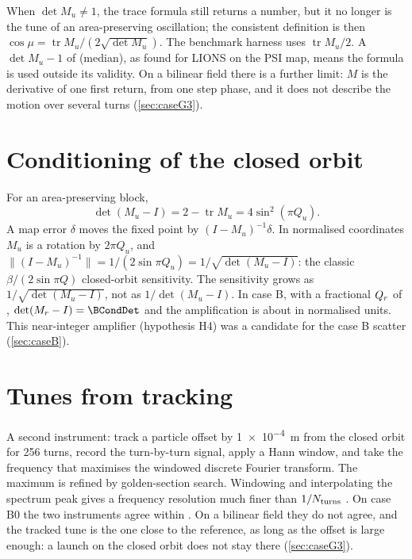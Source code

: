 When $\det M_u\ne1$, the trace formula still returns a number, but it no longer is the tune of an area-preserving
oscillation; the consistent definition is then $\cos\mu = \operatorname{tr}M_u/(2\sqrt{\det M_u})$.
The benchmark harness uses $\operatorname{tr}M_u/2$.
A $\det M_u - 1$ of \GPsiLionsDetMed{} (median), as found for LIONS on the PSI map, means the formula is used outside its validity.
On a bilinear field there is a further limit: $M$ is the derivative of one first return, from one step phase, and it does not describe the motion over several turns (\cref{sec:caseG3}).

\section{Conditioning of the closed orbit}\label{sec:conditioning}
For an area-preserving block,
\begin{equation}
\det(M_u - I) = 2 - \operatorname{tr}M_u = 4\sin^2(\pi Q_u).
\end{equation}
A map error $\delta$ moves the fixed point by $(I-M_u)^{-1}\delta$.
In normalised coordinates $M_u$ is a rotation by $2\pi Q_u$, and $\|(I-M_u)^{-1}\| = 1/(2\sin\pi Q_u) = 1/\sqrt{\det(M_u-I)}$:
the classic $\beta/(2\sin\pi Q)$ closed-orbit sensitivity.
The sensitivity grows as $1/\sqrt{\det(M_u-I)}$, not as $1/\det(M_u-I)$.
In case B, with a fractional $Q_r$ of \BLionsQr, $\det(M_r-I) = \BCondDet$ and the amplification is about \BSens{} in
normalised units.
This near-integer amplifier (hypothesis H4) was a candidate for the case B scatter (\cref{sec:caseB}).

\section{Tunes from tracking}
A second instrument: track a particle offset by \SI{1e-4}{m} from the closed orbit for 256 turns, record the
turn-by-turn signal, apply a Hann window, and take the frequency that maximises the windowed discrete Fourier transform.
The maximum is refined by golden-section search.
Windowing and interpolating the spectrum peak gives a frequency resolution much finer than $1/N_{\rm turns}$
\cite{bartolini1996}.
On case B0 the two instruments agree within \BzeroFFTAgree.
On a bilinear field they do not agree, and the tracked tune is the one close to the reference, as long as the offset is large enough: a launch on the closed orbit does not stay there (\cref{sec:caseG3}).
